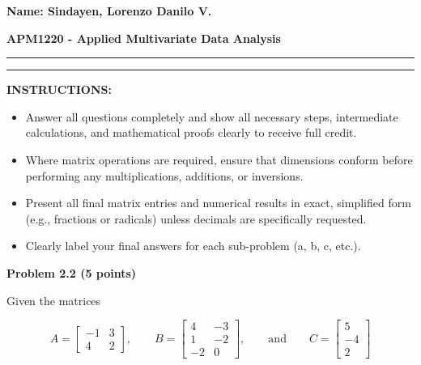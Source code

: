 \documentclass[12pt]{article}
\begin{document}
    
\noindent
\textbf{Name: Sindayen, Lorenzo Danilo V.}

\vspace{0.2cm}

\noindent
\textbf{APM1220 - Applied Multivariate Data Analysis}

\vspace{0.7cm}

\hrule

\vspace{0.5cm}

\hrule

\vspace{0.7cm}

\noindent
\textbf{INSTRUCTIONS:}

\vspace{0.1cm}

\noindent
\begin{itemize}
    \item Answer all questions completely and show all necessary steps, intermediate calculations, and mathematical proofs clearly to receive full credit.

    \item Where matrix operations are required, ensure that dimensions conform before performing any multiplications, additions, or inversions.

    \item Present all final matrix entries and numerical results in exact, simplified form (e.g., fractions or radicals) unless decimals are specifically requested.

    \item Clearly label your final answers for each sub-problem (a, b, c, etc.).
\end{itemize}

\vspace{0.3cm}

\noindent
\textbf{Problem 2.2 (5 points)}

\vspace{0.5cm}

\noindent
Given the matrices

\[
A=
\begin{bmatrix}
-1 & 3\\
4 & 2
\end{bmatrix},
\qquad
B=
\begin{bmatrix}
4 & -3\\
1 & -2\\
-2 & 0
\end{bmatrix},
\qquad
\text{and}
\qquad
C=
\begin{bmatrix}
5\\
-4\\
2
\end{bmatrix}
\]
\end{document}

